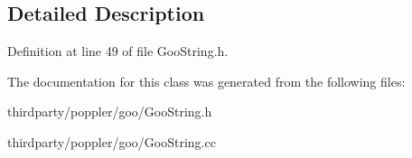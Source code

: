 \subsection{Detailed Description}


Definition at line 49 of file Goo\+String.\+h.



The documentation for this class was generated from the following files\+:\begin{DoxyCompactItemize}
\item 
thirdparty/poppler/goo/Goo\+String.\+h\item 
thirdparty/poppler/goo/Goo\+String.\+cc\end{DoxyCompactItemize}
